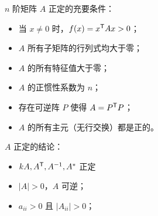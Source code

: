 $n$ 阶矩阵 $A$ 正定的充要条件：
\begin{itemize}
	\item 当 $x \neq 0$ 时，$f(x) = {x}^\mathsf{T}Ax > 0$；
	\item $A$ 所有子矩阵的行列式均大于零；
	\item $A$ 的所有特征值大于零；
	\item $A$ 的正惯性系数为 $n$；
	\item 存在可逆阵 $P$ 使得 $A = {P}^\mathsf{T}P$；
	\item $A$ 的所有主元（无行交换）都是正的。
\end{itemize}

$A$ 正定的结论：
\begin{itemize}
	\item $kA, {A}^\mathsf{T}, A^{-1}, A^*$ 正定
	\item $|A|>0$，$A$ 可逆；
	\item $a_{ii} > 0$ 且 $|A_{ii}| > 0$；
\end{itemize}

